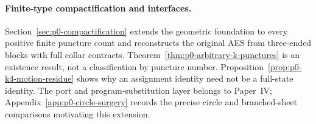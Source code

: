 \paragraph{Finite-type compactification and interfaces.}
Section~\ref{sec:p0-compactification} extends the geometric foundation to
every positive finite puncture count and reconstructs the original AES from
three-ended blocks with full collar contracts.  Theorem~\ref{thm:p0-arbitrary-k-punctures}
is an existence result, not a classification by puncture number.  Proposition~\ref{prop:p0-k4-motion-residue}
shows why an assignment identity need not be a full-state identity.  The
port and program-substitution layer belongs to Paper~IV; Appendix~\ref{app:p0-circle-surgery}
records the precise circle and branched-sheet comparisons motivating this
extension.
